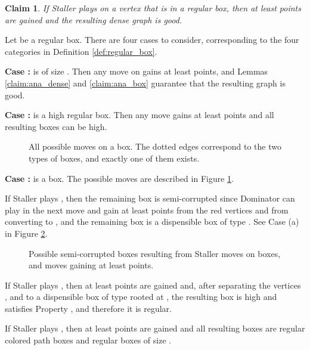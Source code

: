 \documentclass[11pt]{article}
\def\Proof{\par\noindent{\bf Proof:~}}
\newtheorem{claim}[theorem]{Claim}
\theoremstyle{definition}
\begin{document}
\begin{claim}
\label{claim:staller_regular}
If Staller plays on  a vertex  that is in a regular box, then at least  points are gained and the resulting dense graph  is good.
\end{claim}
\Proof
Let  be a regular box.
There are four cases to consider, corresponding to the four categories in Definition \ref{def:regular_box}.

\bigskip
\par\noindent
{\bf Case :}
 is of size .
Then any move on  gains at least  points, and Lemmas \ref{claim:ana_dense} and \ref{claim:ana_box} guarantee that the resulting graph is good.

\bigskip
\par\noindent
{\bf Case :}
 is a high regular box.
Then any move gains at least  points and all resulting boxes can be high.

\begin{figure}[t]
  \caption{\sf All possible moves on a  box. The dotted edges correspond to the two types of  boxes, and exactly one of them exists.}
  \medskip
  \centering
  \label{fig:c12_staller}
\end{figure}

\bigskip
\par\noindent
{\bf Case :}
 is a  box.
The possible moves are described in Figure \ref{fig:c12_staller}.

If Staller plays , 
then the remaining box is semi-corrupted since Dominator can play  in the next move and gain at least  points from the red vertices and from converting  to , 
and the remaining box is a dispensible box of type . 
See Case (a) in Figure \ref{fig:c12_staller_sc}.

\begin{figure}[thbp]
  \caption{\sf Possible semi-corrupted boxes resulting from Staller moves on  boxes, and moves  gaining at least  points.}
  \medskip
  \centering
  \label{fig:c12_staller_sc}
\end{figure}

If Staller plays , then at least  points are gained and, after separating the vertices ,  and  to a dispensible box of type  rooted at ,
the resulting box is high and satisfies Property , and therefore it is regular.

If Staller plays , then at least  points are gained and all resulting boxes are regular colored path boxes and regular boxes of size .
\end{document}
